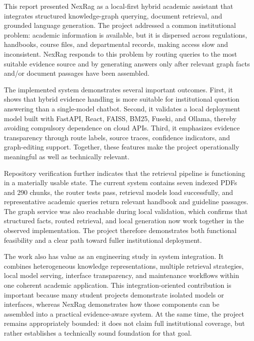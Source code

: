 \newpage
{}
\label{chap:conclusion}

\label{sec:conclusion-summary}

\fontsize{12}{14}\selectfont

This report presented NexRag as a local-first hybrid academic assistant that integrates structured knowledge-graph querying, document retrieval, and grounded language generation. The project addressed a common institutional problem: academic information is available, but it is dispersed across regulations, handbooks, course files, and departmental records, making access slow and inconsistent. NexRag responds to this problem by routing queries to the most suitable evidence source and by generating answers only after relevant graph facts and/or document passages have been assembled.

The implemented system demonstrates several important outcomes. First, it shows that hybrid evidence handling is more suitable for institutional question answering than a single-model chatbot. Second, it validates a local deployment model built with FastAPI, React, FAISS, BM25, Fuseki, and Ollama, thereby avoiding compulsory dependence on cloud APIs. Third, it emphasizes evidence transparency through route labels, source traces, confidence indicators, and graph-editing support. Together, these features make the project operationally meaningful as well as technically relevant.

Repository verification further indicates that the retrieval pipeline is functioning in a materially usable state. The current system contains seven indexed PDFs and 290 chunks, the router tests pass, retrieval models load successfully, and representative academic queries return relevant handbook and guideline passages. The graph service was also reachable during local validation, which confirms that structured facts, routed retrieval, and local generation now work together in the observed implementation. The project therefore demonstrates both functional feasibility and a clear path toward fuller institutional deployment.

The work also has value as an engineering study in system integration. It combines heterogeneous knowledge representations, multiple retrieval strategies, local model serving, interface transparency, and maintenance workflows within one coherent academic application. This integration-oriented contribution is important because many student projects demonstrate isolated models or interfaces, whereas NexRag demonstrates how those components can be assembled into a practical evidence-aware system. At the same time, the project remains appropriately bounded: it does not claim full institutional coverage, but rather establishes a technically sound foundation for that goal.

